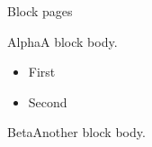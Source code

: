 \documentclass{beamer}
\begin{document}
\begin{frame}[allowframebreaks]{Block pages}
\begin{block}{Alpha}A block body.
\begin{itemize}\item First\item Second\end{itemize}
\end{block}
\newpage
\begin{exampleblock}{Beta}Another block body.\end{exampleblock}
\end{frame}
\end{document}
